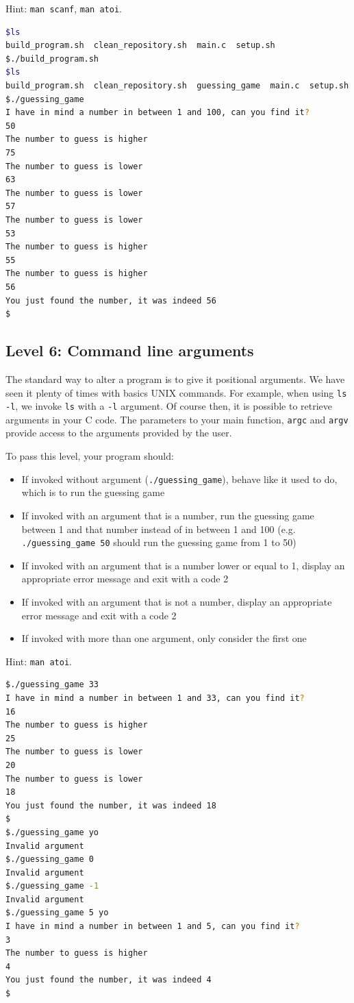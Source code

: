 \documentclass[12pt]{article}
\begin{document}
Hint: \texttt{man scanf}, \texttt{man atoi}.

\begin{lstlisting}[language=bash]
$ls
build_program.sh  clean_repository.sh  main.c  setup.sh
$./build_program.sh
$ls
build_program.sh  clean_repository.sh  guessing_game  main.c  setup.sh
$./guessing_game
I have in mind a number in between 1 and 100, can you find it?
50
The number to guess is higher
75
The number to guess is lower
63
The number to guess is lower
57
The number to guess is lower
53
The number to guess is higher
55
The number to guess is higher
56
You just found the number, it was indeed 56
$
\end{lstlisting}

\subsection{Level 6: Command line arguments}

The standard way to alter a program is to give it positional arguments. We have seen it plenty of times with basics UNIX commands. For example, when using \texttt{ls -l}, we invoke \texttt{ls} with a \texttt{-l} argument.
Of course then, it is possible to retrieve arguments in your C code. The parameters to your main function, \texttt{argc} and \texttt{argv} provide access to the arguments provided by the user.

To pass this level, your program should:
\begin{itemize}
	\item If invoked without argument (\texttt{./guessing\_game}), behave like it used to do, which is to run the guessing game
	\item If invoked with an argument that is a number, run the guessing game between 1 and that number instead of in between 1 and 100 (e.g. \texttt{./guessing\_game 50} should run the guessing game from 1 to 50)
	\item If invoked with an argument that is a number lower or equal to 1, display an appropriate error message and exit with a code 2
	\item If invoked with an argument that is not a number, display an appropriate error message and exit with a code 2
	\item If invoked with more than one argument, only consider the first one
\end{itemize}

Hint: \texttt{man atoi}.

\begin{lstlisting}[language=bash]
$./guessing_game 33
I have in mind a number in between 1 and 33, can you find it?
16
The number to guess is higher
25
The number to guess is lower
20
The number to guess is lower
18
You just found the number, it was indeed 18
$
$./guessing_game yo
Invalid argument
$./guessing_game 0
Invalid argument
$./guessing_game -1
Invalid argument
$./guessing_game 5 yo
I have in mind a number in between 1 and 5, can you find it?
3
The number to guess is higher
4
You just found the number, it was indeed 4
$
\end{lstlisting}
\end{document}
